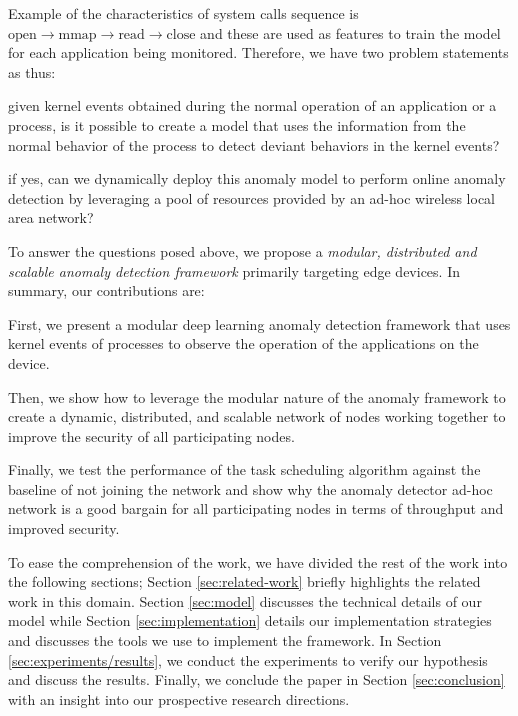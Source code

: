 Example of the characteristics of system calls sequence is 
$\text{open} 
\longrightarrow
\text{mmap} \longrightarrow \text{read} \longrightarrow 
\text{close}$ and 
these are used as features to train the model for each 
application being monitored. Therefore, we have two problem 
statements as thus: 
\begin{enumerate*}[label={\alph*)},font={\bfseries}]
	\item given kernel events obtained during the normal 
	operation of an application or a process, 
	is it possible to create a model that uses the 
	information from the
	normal behavior of the process to detect deviant 
	behaviors in the kernel events?
	\item if yes, can we dynamically deploy this anomaly 
	model to perform online anomaly detection by leveraging a 
	pool of resources provided by an ad-hoc wireless local 
	area network?
\end{enumerate*}
To answer the questions posed above, we propose a 
\emph{modular, distributed and 
scalable anomaly detection framework} primarily targeting 
edge devices. In summary, our contributions are:
\begin{enumerate*}[label={\alph*)},font={\bfseries}]
	\item First, we present a modular deep learning anomaly 
	detection framework that uses kernel events of processes 
	to observe 
	the operation of the applications on the device.
	\item Then, we show how to leverage the modular nature of 
	the anomaly framework to create a dynamic, distributed, 
	and scalable network of nodes working together to 
	improve the security of all participating nodes. 
	\item Finally, we test the performance of the task 
	scheduling algorithm against the baseline of not joining 
	the network and show why the anomaly detector ad-hoc 
	network is a good bargain for all participating nodes in 
	terms of 
	throughput and improved security.
\end{enumerate*} \par
To ease the comprehension of the work, we have divided the 
rest of the work 
into the following sections; Section \ref{sec:related-work} 
briefly highlights 
the related work in this domain. Section \ref{sec:model} 
discusses the 
technical details of our model while Section 
\ref{sec:implementation} details our implementation 
strategies and discusses the tools we use to implement the 
framework. In Section \ref{sec:experiments/results}, we 
conduct the experiments to verify our hypothesis and discuss 
the results. Finally, we conclude the paper in Section 
\ref{sec:conclusion} with an insight into our prospective 
research directions.
